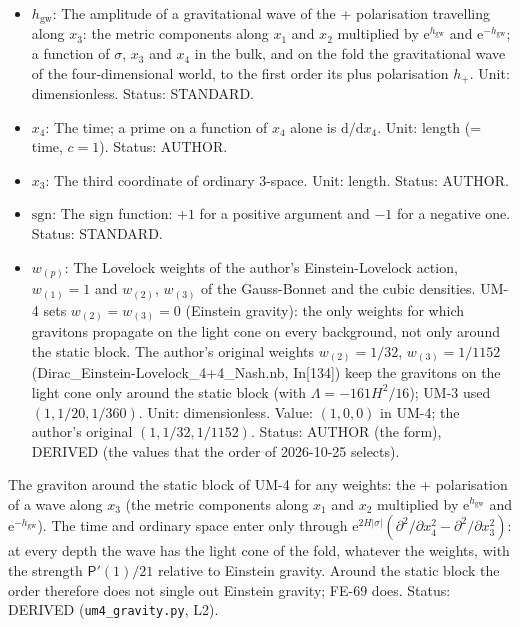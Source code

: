\documentclass[
  10pt,
]{article}
\begin{document}
\begin{itemize}
  dimensions or of the fold). Status: STANDARD.
\item
  \(h_{\mathrm{gw}}\): The amplitude of a gravitational wave of the +
  polarisation travelling along \(x_3\): the metric components along
  \(x_1\) and \(x_2\) multiplied by \(\mathrm{e}^{h_{\mathrm{gw}}}\) and
  \(\mathrm{e}^{-h_{\mathrm{gw}}}\); a function of \(\sigma\), \(x_3\)
  and \(x_4\) in the bulk, and on the fold the gravitational wave of the
  four-dimensional world, to the first order its plus polarisation
  \(h_{+}\). Unit: dimensionless. Status: STANDARD.
\item
  \(x_4\): The time; a prime on a function of \(x_4\) alone is
  \(\mathrm{d}/\mathrm{d}x_4\). Unit: length (= time, \(c = 1\)).
  Status: AUTHOR.
\item
  \(x_3\): The third coordinate of ordinary 3-space. Unit: length.
  Status: AUTHOR.
\item
  \(\mathrm{sgn}\): The sign function: \(+1\) for a positive argument
  and \(-1\) for a negative one. Status: STANDARD.
\item
  \(w_{(p)}\): The Lovelock weights of the author's Einstein-Lovelock
  action, \(w_{(1)} = 1\) and \(w_{(2)}\), \(w_{(3)}\) of the
  Gauss-Bonnet and the cubic densities. UM-4 sets
  \(w_{(2)} = w_{(3)} = 0\) (Einstein gravity): the only weights for
  which gravitons propagate on the light cone on every background, not
  only around the static block. The author's original weights
  \(w_{(2)} = 1/32\), \(w_{(3)} = 1/1152\)
  (Dirac\_Einstein-Lovelock\_4+4\_Nash.nb, In{[}134{]}) keep the
  gravitons on the light cone only around the static block (with
  \(\Lambda = -161H^2/16\)); UM-3 used \((1, 1/20, 1/360)\). Unit:
  dimensionless. Value: \((1, 0, 0)\) in UM-4; the author's original
  \((1, 1/32, 1/1152)\). Status: AUTHOR (the form), DERIVED (the values
  that the order of 2026-10-25 selects).
\end{itemize}

The graviton around the static block of UM-4 for any weights: the +
polarisation of a wave along \(x_3\) (the metric components along
\(x_1\) and \(x_2\) multiplied by \(\mathrm{e}^{h_{\mathrm{gw}}}\) and
\(\mathrm{e}^{-h_{\mathrm{gw}}}\)). The time and ordinary space enter
only through
\(\mathrm{e}^{2H\lvert\sigma\rvert}(\partial^2/\partial x_4^2 - \partial^2/\partial x_3^2)\):
at every depth the wave has the light cone of the fold, whatever the
weights, with the strength \(\mathsf{P}'(1)/21\) relative to Einstein
gravity. Around the static block the order therefore does not single out
Einstein gravity; FE-69 does. Status: DERIVED (\texttt{um4\_gravity.py},
L2).
\end{document}
